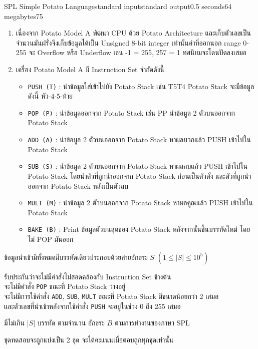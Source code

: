 \documentclass[11pt,a4paper]{article}
\begin{document}
\begin{problem}{SPL Simple Potato Language}{standard input}{standard output}{0.5 seconds}{64 megabytes}{75}
\begin{enumerate}
    \item เนื่องจาก Potato Model A พัฒนา CPU ด้วย Potato Architecture และเก็บตัวเลขเป็นจำนวนมันฝรั่งจึงเก็บข้อมูลได้เป็น Unsigned 8-bit integer เท่านั้นค่าที่ออกนอก range 0-255 จะ Overflow หรือ Underflow เช่น -1 = 255, 257 = 1 ทศนิยมจะโดนปัดลงเสมอ
    \item เครื่อง Potato Model A มี Instruction Set จำกัดดังนี้
    \begin{itemize}
        \item \verb|PUSH (T)| : นำข้อมูลใส่เข้าไปยัง Potato Stack เช่น T5T4 Potato Stack จะมีข้อมูลดังนี้ หัว-4-5-ท้าย
        \item \verb|POP (P)| : นำข้อมูลออกจาก Potato Stack เช่น PP นำข้อมูล 2 ตัวบนออกจาก Potato Stack
        \item \verb|ADD (A)| : นำข้อมูล 2 ตัวบนออกจาก Potato Stack หาผลบวกแล้ว PUSH เข้าไปใน Potato Stack
        \item \verb|SUB (S)| : นำข้อมูล 2 ตัวบนออกจาก Potato Stack หาผลลบแล้ว PUSH เข้าไปใน Potato Stack โดยนำตัวที่ถูกนำออกจาก Potato Stack ก่อนเป็นตัวตั้ง และตัวที่ถูกนำออกจาก Potato Stack หลังเป็นตัวลบ
        \item \verb|MULT (M)| : นำข้อมูล 2 ตัวบนออกจาก Potato Stack หาผลคูณแล้ว PUSH เข้าไปใน Potato Stack
        \item \verb|BAKE (B)| : Print ข้อมูลตัวบนสุดของ Potato Stack หลังจากนั้นขึ้นบรรทัดใหม่ โดยไม่ POP มันออก
    \end{itemize}    
\end{enumerate}

\InputFile
ข้อมูลนำเข้ามีทั้งหมดมีบรรทัดเดียวประกอบด้วยสายอักขระ $S$ $(1\leq |S|\leq 10^5)$

รับประกันว่าจะไม่มีคำสั่งไม่สอดคล้องกับ Instruction Set ข้างต้น \\จะไม่มีคำสั่ง \verb|POP| ขณะที่ Potato Stack ว่างอยู่ \\จะไม่มีการใช้คำสั่ง \verb|ADD|, \verb|SUB|, \verb|MULT| ขณะที่ Potato Stack มีขนาดน้อยกว่า 2 เสมอ \\และตัวเลขที่นำเข้าหลังจากใช้คำสั่ง \verb|PUSH| จะอยู่ในช่วง 0 ถึง 255 เสมอ


\OutputFile
มีไม่เกิน $|S|$ บรรทัด ตามจำนวน อักขระ $B$ ตามการทำงานของภาษา SPL

\Scoring
ชุดทดสอบจะถูกแบ่งเป็น 2 ชุด จะได้คะแนนเมื่อตอบถูกทุกชุดเท่านั้น

\begin{description}


\end{description}
\end{problem}
\end{document}
